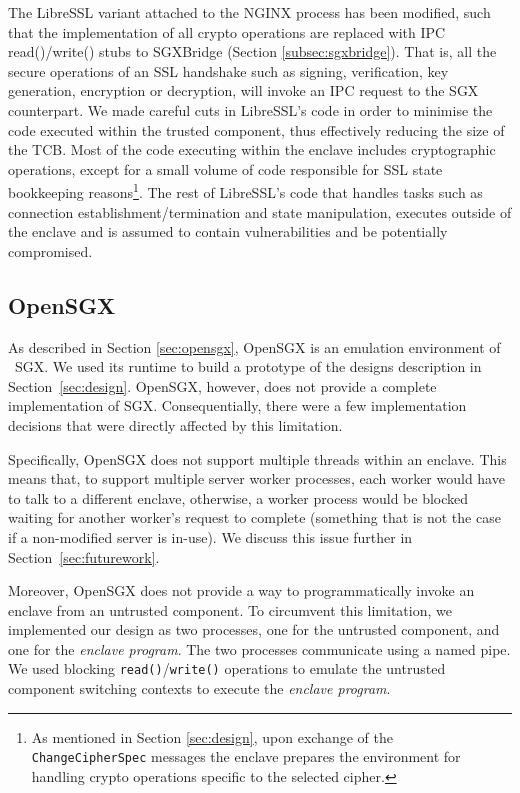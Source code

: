 \documentclass[../main.tex]{subfiles}
\begin{document}
The LibreSSL variant attached to the NGINX process has been modified, such that
the implementation of all crypto operations are replaced with IPC
read()/write() stubs to SGXBridge (Section \ref{subsec:sgxbridge}). That is,
all the secure operations of an SSL handshake such as signing, verification,
key generation, encryption or decryption, will invoke an IPC request to the SGX
counterpart. We made careful cuts in LibreSSL's code in order to minimise the
code executed within the trusted component, thus effectively reducing the size
of the TCB. Most of the code executing within the enclave includes
cryptographic operations, except for a small volume of code responsible for
SSL state bookkeeping reasons\footnote{As mentioned in Section
\ref{sec:design}, upon exchange of the \texttt{ChangeCipherSpec} messages the
enclave prepares the environment for handling crypto operations specific to
the selected cipher.}. The rest of LibreSSL's code that handles tasks such as
connection establishment/termination and state manipulation, executes outside
of the enclave and is assumed to contain vulnerabilities and be potentially
compromised.

\subsection{OpenSGX}
\label{subsec:opensgx}
As described in Section \ref{sec:opensgx}, OpenSGX is an emulation
environment of \Intel~SGX. We used its runtime to build a prototype of
the designs description in Section~\ref{sec:design}. OpenSGX, however,
does not provide a complete implementation of SGX. Consequentially,
there were a few implementation decisions that were directly affected
by this limitation.

Specifically, OpenSGX does not support multiple threads within an
enclave. This means that, to support multiple server worker processes,
each worker would have to talk to a different enclave, otherwise, a
worker process would be blocked waiting for another worker's request
to complete (something that is not the case if a non-modified server
is in-use). We discuss this issue further in
Section~\ref{sec:futurework}.

Moreover, OpenSGX does not provide a way to programmatically invoke an
enclave from an untrusted component. To circumvent this limitation, we
implemented our design as two processes, one for the untrusted
component, and one for the \textit{enclave program}. The two processes
communicate using a named pipe. We used blocking
\texttt{read()}/\texttt{write()} operations to emulate the untrusted
component switching contexts to execute the \textit{enclave program}.
\end{document}
